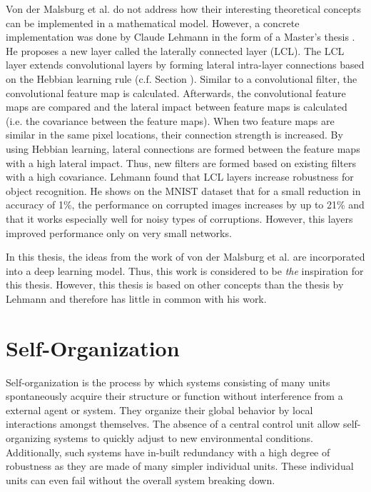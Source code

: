 Von der Malsburg et al. \cite{von_der_Malsburg_Stadelmann_Grewe_2022} do not address how their interesting theoretical concepts can be implemented in a mathematical model.
However, a concrete implementation was done by Claude Lehmann in the form of a Master's thesis .
He proposes a new layer called the laterally connected layer (LCL).
The LCL layer extends convolutional layers by forming lateral intra-layer connections based on the Hebbian learning rule (c.f. Section ).
Similar to a convolutional filter, the convolutional feature map is calculated.
Afterwards, the convolutional feature maps are compared and the lateral impact between feature maps is calculated (i.e. the covariance between the feature maps).
When two feature maps are similar in the same pixel locations, their connection strength is increased.
By using Hebbian learning, lateral connections are formed between the feature maps with a high lateral impact.
Thus, new filters are formed based on existing filters with a high covariance.
Lehmann found that LCL layers increase robustness for object recognition.
He shows on the MNIST dataset \cite{Lecun_Bottou_Bengio_Haffner_1998} that for a small reduction in accuracy of 1\%, the performance on corrupted images increases by up to 21\% and that it works especially well for noisy types of corruptions.
However, this layers improved performance only on very small networks.

In this thesis, the ideas from the work of von der Malsburg et al. \cite{von_der_Malsburg_Stadelmann_Grewe_2022} are incorporated into a deep learning model.
Thus, this work is considered to be \emph{the} inspiration for this thesis.
However, this thesis is based on other concepts than the thesis by Lehmann \cite{lehmann} and therefore has little in common with his work.

\section{Self-Organization}
Self-organization is the process by which systems consisting of many units spontaneously acquire their structure or function without interference from a external agent or system.
They organize their global behavior by local interactions amongst themselves.
The absence of a central control unit allow self-organizing systems to quickly adjust to new environmental conditions.
Additionally, such systems have in-built redundancy with a high degree of robustness as they  are made of many simpler individual units.
These individual units can even fail without the overall system breaking down.


